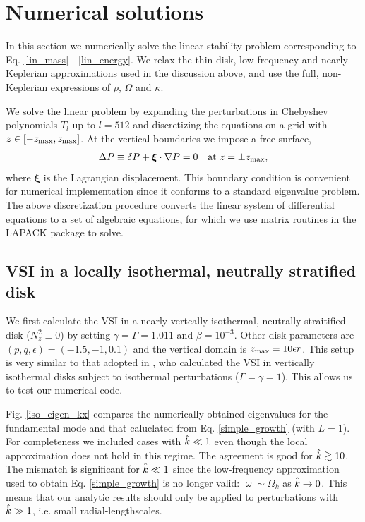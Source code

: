 \section{Numerical solutions}
In this section we numerically solve the linear stability problem
corresponding to Eq. \ref{lin_mass}---\ref{lin_energy}. 
We relax the thin-disk, low-frequency and nearly-Keplerian
approximations used in the discussion above, and 
use the full, non-Keplerian expressions of $\rho$, $\Omega$ and
$\kappa$.

We solve the linear problem by expanding the
perturbations in Chebyshev polynomials $T_l$ up to $l=512$
and discretizing the equations on a grid with
$z\in[-z_\mathrm{max},z_\mathrm{max}]$. At the vertical boundaries we impose a free
surface, 
\begin{align}
  \Delta P \equiv \delta P + \bm{\xi}\cdot\nabla P= 0 \quad \text{at } z=\pm z_\mathrm{max},
\end{align}
where $\bm{\xi}$ is the Lagrangian displacement. This boundary
condition is convenient for numerical implementation since it conforms
to a standard eigenvalue problem. The above discretization procedure
converts the linear system of differential equations to a set of 
algebraic equations, for which we use matrix routines in the LAPACK
package to solve. 


\subsection{VSI in a locally isothermal, neutrally stratified disk}\label{vertiso_pertiso} 
We first calculate the VSI in a nearly vertcally isothermal, neutrally
straitified disk ($N_z^2\equiv0$) by setting
$\gamma=\Gamma=1.011$ and $\beta=10^{-3}$. Other disk parameters are 
$(p,q,\epsilon)=(-1.5,-1,0.1)$ and the vertical domain is $z_\mathrm{max} =
10\epsilon r$. This setup is very similar to that adopted in
\cite{mcnally14}, who calculated the VSI in vertically isothermal
disks subject to isothermal perturbations ($\Gamma=\gamma=1$).  This
allows us to test our numerical code.  



Fig. \ref{iso_eigen_kx} compares the numerically-obtained eigenvalues
for the fundamental mode and that caluclated from
Eq. \ref{simple_growth} (with $L=1$). For completeness we
included cases with $\hat{k}\ll 1$ even though the local
approximation does not hold in this regime. The agreement is good for
$\hat{k}\gtrsim10$. The mismatch is significant for $\hat{k}\ll1$ since
the low-frequency approximation used to obtain Eq. \ref{simple_growth}
is no longer valid: $|\omega|\sim\Omega_k$ as $\hat{k}\to 0$. This means
that our analytic results should only be applied to perturbations with
$\hat{k}\gg 1$, i.e. small radial-lengthscales. 

